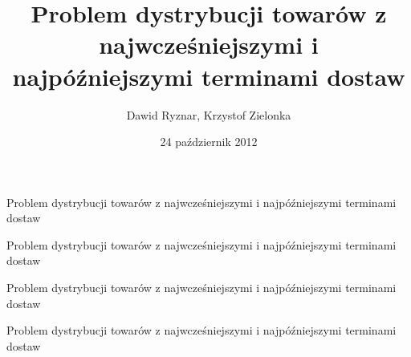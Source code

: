 \documentclass{beamer}
\title{Problem  dystrybucji towarów z najwcześniejszymi i najpóźniejszymi terminami dostaw}
\author{Dawid Ryznar, Krzystof Zielonka}
\date{24 październik 2012}
\begin{document}
\frame{\titlepage}

\begin{frame}{Problem  dystrybucji towarów z najwcześniejszymi i najpóźniejszymi terminami dostaw}
	
\end{frame}

\begin{frame}{Problem dystrybucji towarów z najwcześniejszymi i najpóźniejszymi terminami dostaw}
	
\end{frame}

\begin{frame}{Problem  dystrybucji towarów z najwcześniejszymi i najpóźniejszymi terminami dostaw}
	
\end{frame}

\begin{frame}{Problem  dystrybucji towarów z najwcześniejszymi i najpóźniejszymi terminami dostaw}
	 
\end{frame}
\end{document}
